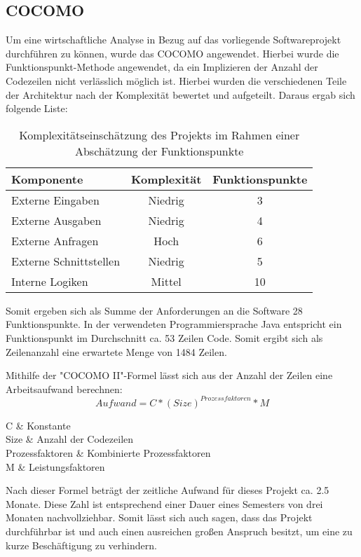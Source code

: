 {	\subsection{COCOMO}
	Um eine wirtschaftliche Analyse in Bezug auf das vorliegende Softwareprojekt durchführen zu können, wurde das COCOMO angewendet. Hierbei wurde die Funktionspunkt-Methode angewendet, da ein Implizieren der Anzahl der Codezeilen nicht verlässlich möglich ist. Hierbei wurden die verschiedenen Teile der Architektur nach der Komplexität bewertet und aufgeteilt. Daraus ergab sich folgende Liste:
	\begin{table}[H]
		\centering
		\footnotesize
	\begin{tabular}{l | c | c}
		\textbf{Komponente} & \textbf{Komplexität} & \textbf{Funktionspunkte} \\ \hline
		Externe Eingaben & Niedrig & 3 \\ \hline
		Externe Ausgaben & Niedrig & 4 \\ \hline
		Externe Anfragen & Hoch & 6 \\ \hline
		Externe Schnittstellen & Niedrig & 5\\ \hline
		Interne Logiken & Mittel & 10\\
	\end{tabular}
	\caption{Komplexitätseinschätzung des Projekts im Rahmen einer Abschätzung der Funktionspunkte}
	\end{table}
	Somit ergeben sich als Summe der Anforderungen an die Software 28 Funktionspunkte. In der verwendeten Programmiersprache Java entspricht ein Funktionspunkt im Durchschnitt ca. 53 Zeilen Code. Somit ergibt sich als Zeilenanzahl eine erwartete Menge von 1484 Zeilen.
	
	Mithilfe der "COCOMO II"-Formel lässt sich aus der Anzahl der Zeilen eine Arbeitsaufwand berechnen:
	\begin{equation}\label{cocomo}
	Aufwand = C * (Size)^{Prozessfaktoren} * M
	\end{equation}
	\begin{conditions*}
		C & Konstante\\
		Size & Anzahl der Codezeilen\\
		Prozessfaktoren & Kombinierte Prozessfaktoren\\
		M & Leistungsfaktoren\\
	\end{conditions*}

	Nach dieser Formel beträgt der zeitliche Aufwand für dieses Projekt ca. 2.5 Monate. Diese Zahl ist entsprechend einer Dauer eines Semesters von drei Monaten nachvollziehbar. Somit lässt sich auch sagen, dass das Projekt durchführbar ist und auch einen ausreichen großen Anspruch besitzt, um eine zu kurze Beschäftigung zu verhindern.
}